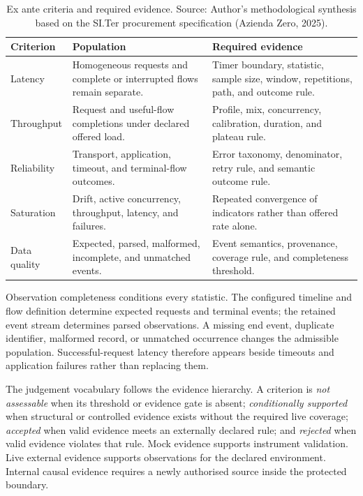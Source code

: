 \begingroup
\renewcommand{\arraystretch}{1.0}
\begin{table}[H]
    \centering
    \caption[Ex ante criteria and required evidence]{Ex ante criteria and
    required evidence. Source: Author's methodological synthesis based on
    the SI.Ter procurement specification (Azienda Zero, 2025).}
    \label{tab:ex-ante-criteria}
    \small
    \begin{tabular}{|>{\raggedright\arraybackslash}p{2.7cm}|>{\raggedright\arraybackslash}p{4.1cm}|>{\raggedright\arraybackslash}p{4.8cm}|}
    \hline
    \rowcolor{veryPeri!18}
    \textbf{Criterion} & \textbf{Population} & \textbf{Required evidence} \\
    \hline
    \rowcolor{tableGray}
    Latency & Homogeneous requests and complete or interrupted flows remain separate. & Timer boundary, statistic, sample size, window, repetitions, path, and outcome rule. \\
    \hline
    Throughput & Request and useful-flow completions under declared offered load. & Profile, mix, concurrency, calibration, duration, and plateau rule. \\
    \hline
    \rowcolor{tableGray}
    Reliability & Transport, application, timeout, and terminal-flow outcomes. & Error taxonomy, denominator, retry rule, and semantic outcome rule. \\
    \hline
    Saturation & Drift, active concurrency, throughput, latency, and failures. & Repeated convergence of indicators rather than offered rate alone. \\
    \hline
    \rowcolor{tableGray}
    Data quality & Expected, parsed, malformed, incomplete, and unmatched events. & Event semantics, provenance, coverage rule, and completeness threshold. \\
    \hline
\end{tabular}
\end{table}
\endgroup

\noindent Observation completeness conditions every statistic. The configured
timeline and flow definition determine expected requests and terminal events; the
retained event stream determines parsed observations. A missing end event,
duplicate identifier, malformed record, or unmatched occurrence changes the
admissible population. Successful-request latency therefore appears beside
timeouts and application failures rather than replacing them.

\noindent The judgement vocabulary follows the evidence hierarchy. A criterion is
\emph{not assessable} when its threshold or evidence gate is absent;
\emph{conditionally supported} when structural or controlled evidence exists
without the required live coverage; \emph{accepted} when valid evidence meets an
externally declared rule; and \emph{rejected} when valid evidence violates that
rule. Mock evidence supports instrument validation. Live external evidence
supports observations for the declared environment. Internal causal evidence
requires a newly authorised source inside the protected boundary.

